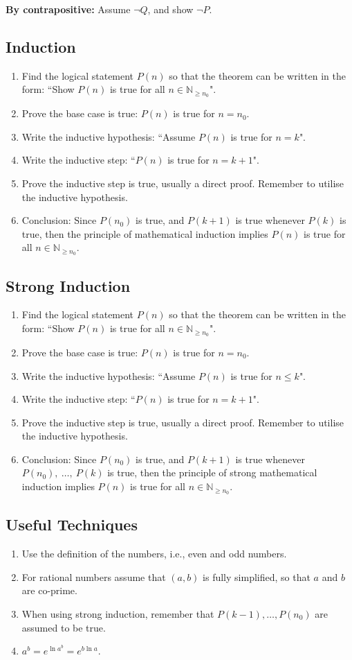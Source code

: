 \documentclass{article}
\theoremstyle{plain}
\numberwithin{theorem}{section}
\theoremstyle{definition}
\numberwithin{definition}{section}
\theoremstyle{remark}
\numberwithin{note}{section}
\newcommand*{\N}{\mathbb{N}}
\begin{document}
\noindent\textbf{By contrapositive:} Assume $\neg{Q}$, and show $\neg{P}$.
%
\subsection{Induction}
\begin{enumerate}
    \item Find the logical statement $P(n)$ so that the theorem can be written in the form: ``Show $P(n)$ is true for all $n \in \N_{\geq n_0}$".
    \item Prove the base case is true: $P(n)$ is true for $n=n_0$.
    \item Write the inductive hypothesis: ``Assume $P(n)$ is true for $n=k$".
    \item Write the inductive step: ``$P(n)$ is true for $n=k+1$".
    \item Prove the inductive step is true, usually a direct proof. Remember to utilise the inductive hypothesis.
    \item Conclusion: Since $P(n_0)$ is true, and $P(k+1)$ is true whenever $P(k)$ is true, then the principle of mathematical induction implies $P(n)$ is true for all $n\in \N_{\geq n_0}$.
\end{enumerate}
%
\subsection{Strong Induction}
\begin{enumerate}
    \item Find the logical statement $P(n)$ so that the theorem can be written in the form: ``Show $P(n)$ is true for all $n \in \N_{\geq n_0}$".
    \item Prove the base case is true: $P(n)$ is true for $n=n_0$.
    \item Write the inductive hypothesis: ``Assume $P(n)$ is true for $n\leq k$".
    \item Write the inductive step: ``$P(n)$ is true for $n=k+1$".
    \item Prove the inductive step is true, usually a direct proof. Remember to utilise the inductive hypothesis.
    \item Conclusion: Since $P(n_0)$ is true, and $P(k+1)$ is true whenever $P(n_0),\: \ldots,\: P(k)$ is true, then the principle of strong mathematical induction implies $P(n)$ is true for all $n\in \N_{\geq n_0}$.
\end{enumerate}
%
\subsection{Useful Techniques}
\begin{enumerate}
    \item Use the definition of the numbers, i.e., even and odd numbers.
    \item For rational numbers assume that $(a,b)$ is fully simplified, so that $a$ and $b$ are co-prime.
    \item When using strong induction, remember that $P(k-1), \ldots, P(n_0)$ are assumed to be true.
    \item $a^b=e^{\ln{a^b}}=e^{b\ln{a}}$.
\end{enumerate}
%
\end{document}
